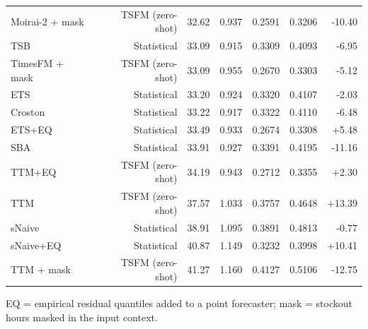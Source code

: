 \begin{table}[t]
\begin{tabular}{lrrrrrr}
Moirai-2 + mask & TSFM (zero-shot) & 32.62 & 0.937 & 0.2591 & 0.3206 & -10.40 \\
TSB & Statistical & 33.09 & 0.915 & 0.3309 & 0.4093 & -6.95 \\
TimesFM + mask & TSFM (zero-shot) & 33.09 & 0.955 & 0.2670 & 0.3303 & -5.12 \\
ETS & Statistical & 33.20 & 0.924 & 0.3320 & 0.4107 & -2.03 \\
Croston & Statistical & 33.22 & 0.917 & 0.3322 & 0.4110 & -6.48 \\
ETS+EQ & Statistical & 33.49 & 0.933 & 0.2674 & 0.3308 & +5.48 \\
SBA & Statistical & 33.91 & 0.927 & 0.3391 & 0.4195 & -11.16 \\
TTM+EQ & TSFM (zero-shot) & 34.19 & 0.943 & 0.2712 & 0.3355 & +2.30 \\
TTM & TSFM (zero-shot) & 37.57 & 1.033 & 0.3757 & 0.4648 & +13.39 \\
sNaive & Statistical & 38.91 & 1.095 & 0.3891 & 0.4813 & -0.77 \\
sNaive+EQ & Statistical & 40.87 & 1.149 & 0.3232 & 0.3998 & +10.41 \\
TTM + mask & TSFM (zero-shot) & 41.27 & 1.160 & 0.4127 & 0.5106 & -12.75 \\
\bottomrule
\end{tabular}
\begin{tablenotes}\footnotesize
\item EQ = empirical residual quantiles added to a point forecaster; mask = stockout hours masked in the input context.
\end{tablenotes}
\end{table}

